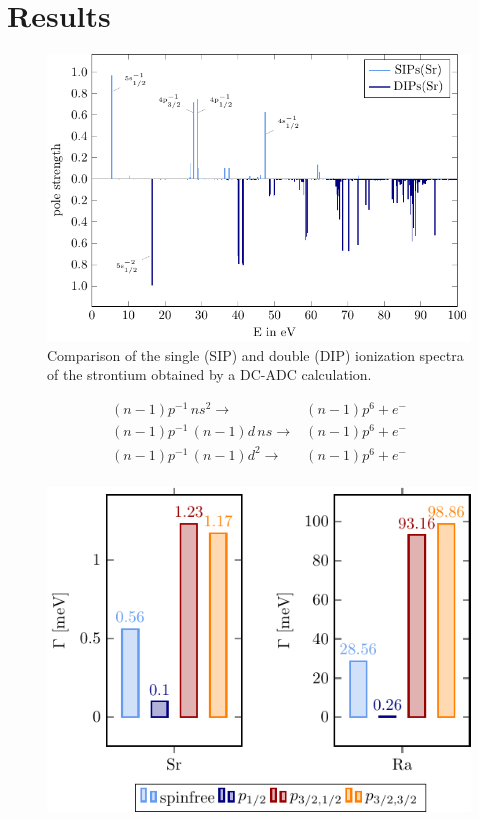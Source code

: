\section{Results}
\label{section:results}

\begin{figure}[h]
 \centering
 \includegraphics[width=\columnwidth]{pics/Sr_rel_sdip.pdf}
 \caption{Comparison of the single (SIP) and double (DIP) ionization spectra
          of the strontium obtained by a DC-ADC calculation.}
 \label{fig:sdip}
\end{figure}




\begin{align*}
 (n-1)p^{-1} \,ns^2         \rightarrow & (n-1)p^6 + e^- \\
 (n-1)p^{-1} \,(n-1)d \, ns \rightarrow & (n-1)p^6 + e^- \\
 (n-1)p^{-1} \,(n-1)d^2     \rightarrow & (n-1)p^6 + e^- \\
\end{align*}


\begin{figure}[h]
 \centering
 \includegraphics[width=0.95\columnwidth]{pics/gamma_group.pdf}
 \caption{}
 \label{fig:gamma}
\end{figure}

